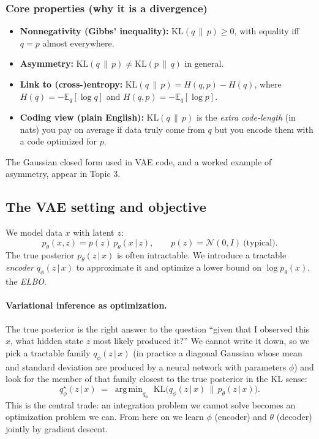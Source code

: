 \documentclass[11pt]{article}
\newcommand{\E}{\mathbb{E}}
\newcommand{\KL}{\mathrm{KL}}
\newcommand{\given}{\,\vert\,}
\DeclareMathOperator*{\argmin}{arg\,min}
\theoremstyle{remark}
\begin{document}
\subsubsection*{Core properties (why it is a divergence)}
\begin{itemize}[leftmargin=1.2em]
  \item \textbf{Nonnegativity (Gibbs' inequality):} $\KL(q\,\|\,p)\ge 0$, with equality iff $q=p$ almost everywhere.
  \item \textbf{Asymmetry:} $\KL(q\,\|\,p)\neq \KL(p\,\|\,q)$ in general.
  \item \textbf{Link to (cross-)entropy:} $\KL(q\,\|\,p)=H(q,p)-H(q)$, where $H(q)=-\E_q[\log q]$ and $H(q,p)=-\E_q[\log p]$.
  \item \textbf{Coding view (plain English):} $\KL(q\,\|\,p)$ is the \emph{extra code-length} (in nats) you pay on average if data truly come from $q$ but you encode them with a code optimized for $p$.
\end{itemize}
The Gaussian closed form used in VAE code, and a worked example of asymmetry, appear in Topic 3.

\subsection{The VAE setting and objective}
We model data $x$ with latent $z$:
\[
p_\theta(x,z)=p(z)\,p_\theta(x\given z),\qquad p(z)=\mathcal N(0,I)\ \text{(typical)}.
\]
The true posterior $p_\theta(z\given x)$ is often intractable. We introduce a tractable \emph{encoder} $q_\phi(z\given x)$ to approximate it and optimize a lower bound on $\log p_\theta(x)$, the \emph{ELBO}.

\paragraph{Variational inference as optimization.}
The true posterior is the right answer to the question ``given that I observed this $x$, what hidden state $z$ most likely produced it?'' We cannot write it down, so we pick a tractable family $q_\phi(z\given x)$ (in practice a diagonal Gaussian whose mean and standard deviation are produced by a neural network with parameters $\phi$) and look for the member of that family closest to the true posterior in the KL sense:
\[
q_\phi^{\star}(z\given x) \;=\; \argmin_{q_\phi}\; \KL\!\big(q_\phi(z\given x)\,\|\,p_\theta(z\given x)\big).
\]
This is the central trade: an integration problem we cannot solve becomes an optimization problem we can. From here on we learn $\phi$ (encoder) and $\theta$ (decoder) jointly by gradient descent.
\end{document}
